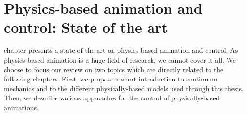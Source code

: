 \chapter[State of the art]{Physics-based animation and control: State of the art}
\label{chap:star}
 chapter presents a state of the art on physics-based animation and control.
As physics-based animation is a huge field of research, we cannot cover it all.
We choose to focus our review on two topics which are directly related to the following chapters.
First, we propose a short introduction to continuum mechanics and to the different physically-based models used through this thesis.
Then, we describe various approaches for the control of physically-based animations.



